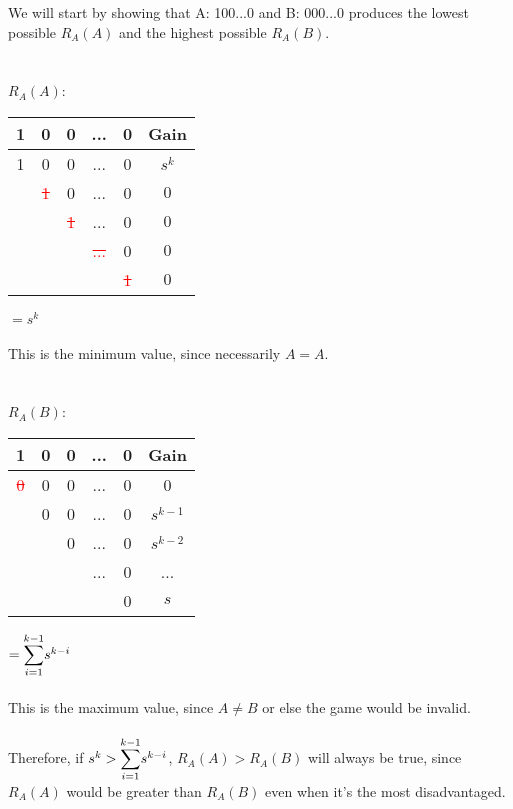 \documentclass[english,12pt,a4paper,final]{article}
\begin{document}
We will start by showing that A: 100...0 and B: 000...0 produces the lowest possible $R_A(A)$ and the highest possible $R_A(B)$.
\\\\\\
${R_A(A)}$:
\begin{tabular}{|ccccc|c|}
	\hline
	1 & 0 & 0 & ... & 0 & Gain \\
	\hline
	
	\textcolor{OliveGreen}{1} & \textcolor{OliveGreen}{0} & \textcolor{OliveGreen}{0} & \textcolor{OliveGreen}{...} & \textcolor{OliveGreen}{0} & $s^k$\\
	
	& \textcolor{red}{\sout{1}} & 0 & ... & 0 & $0$ \\
	
	&  & \textcolor{red}{\sout{1}} & ... & 0 & $0$ \\
	
	&  &  & \textcolor{red}{\sout{...}} & 0 & $0$ \\
	
	&  &  &  & \textcolor{red}{\sout{1}} & $0$ \\
	\hline
\end{tabular}
$=s^k$
\\\\
This is the minimum value, since necessarily $A=A$.
\\\\\\
${R_A(B)}$:
\begin{tabular}{|ccccc|c|}
	\hline
	1 & 0 & 0 & ... & 0 & Gain \\
	\hline
	
	\textcolor{red}{\sout{0}} & 0 & 0 & ... & 0 & 0\\
	
	& \textcolor{OliveGreen}{0} & \textcolor{OliveGreen}{0} & \textcolor{OliveGreen}{...} & \textcolor{OliveGreen}{0} & $s^{k-1}$\\
	
	&  & \textcolor{OliveGreen}{0} & \textcolor{OliveGreen}{...} & \textcolor{OliveGreen}{0} & $s^{k-2}$ \\
	
	&  &  & \textcolor{OliveGreen}{...} & \textcolor{OliveGreen}{0} & ... \\
	
	&  &  &  & \textcolor{OliveGreen}{0} & $s$ \\
	\hline
\end{tabular}
$=\mathlarger\sum_{i=1}^{k-1}s^{k-i}$
\\\\
This is the maximum value, since $A \neq B$ or else the game would be invalid.
\\\\
Therefore, if $s^k > \mathlarger\sum_{i=1}^{k-1}s^{k-i}$, ${R_A(A) > R_A(B)}$ will always be true, since $R_A(A)$ would be greater than $R_A(B)$ even when it's the most disadvantaged.
\end{document}
